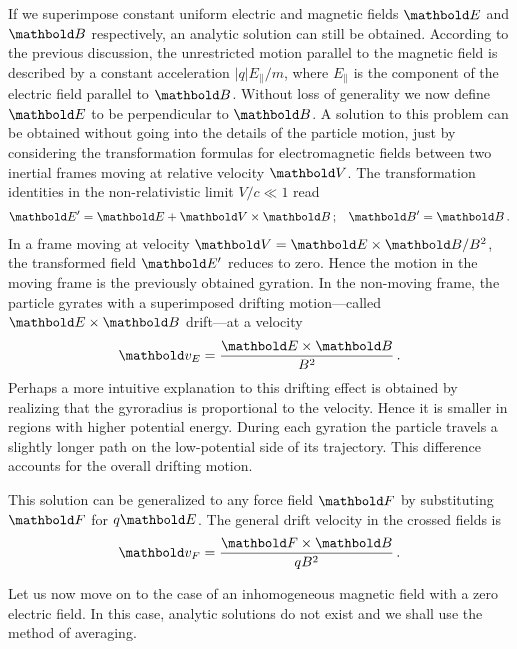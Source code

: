 If we superimpose constant uniform electric and magnetic fields $\mb E$
and $\mb B$ respectively, an analytic solution can still be obtained.
According to the previous discussion, the unrestricted motion parallel
to the magnetic field is described by a constant acceleration
$|q|E_\|/m$, where $E_\|$ is the component of the electric field
parallel to $\mb B$. Without loss of generality we now define $\mb E$ to
be perpendicular to $\mb B$. A solution to this problem can be obtained
without going into the details of the particle motion, just by considering
the transformation formulas for electromagnetic fields between two
inertial frames moving at relative velocity $\mb V$. The transformation
identities in the non-relativistic limit $V/c\ll1$ read
\begin{align}
    \mb E' &= \mb E + \mb V\times\mb B\,; & \mb B' = \mb B\,.
\end{align}
In a frame moving at velocity $\mb V = \mb E\times \mb B/B^2$, the
transformed field $\mb E'$ reduces to zero. Hence the motion in the
moving frame is the previously obtained gyration. In the non-moving frame,
the particle gyrates with a superimposed drifting motion---called
$\mb E\times\mb B$ drift---at a velocity
\begin{equation}
    \mb v_{E} = \frac{\mb E\times\mb B}{B^2}\,.
\end{equation}
Perhaps a more intuitive explanation to this drifting effect is obtained
by realizing that the gyroradius is proportional to the velocity.
Hence it is smaller in regions with higher
potential energy. During each gyration the particle travels a slightly
longer path on the low-potential side of its trajectory. This difference
accounts for the overall drifting motion.

This solution can be generalized to any force field $\mb F$ by substituting
$\mb F$ for $q\mb E$. The general drift velocity in the crossed fields is
\begin{equation}
    \mb v_{F} = \frac{\mb F\times\mb B}{qB^2}\,.
    \label{eq:part:crossdrift}
\end{equation}

Let us now move on to the case of an inhomogeneous magnetic field with a zero
electric field. In this case, analytic solutions do not exist and we shall
use the method of averaging.

